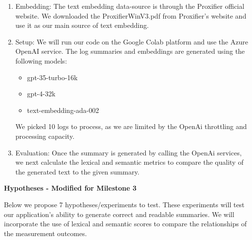 \documentclass[conference]{IEEEtran}
\begin{document}
\begin{enumerate}
      
    \item Embedding: The text embedding data-source is through the Proxifier official website. We downloaded the ProxifierWinV3.pdf from Proxifier's website and use it as our main source of text embedding.
    \item Setup: We will run our code on the Google Colab platform and use the Azure OpenAI service. The log summaries and embeddings are generated using the following models:
    \begin{itemize}
    \item gpt-35-turbo-16k
    \item gpt-4-32k
    \item text-embedding-ada-002
    \end{itemize}
    We picked 10 logs to process, as we are limited by the OpenAi throttling and processing capacity. 
    \item Evaluation: Once the summary is generated by calling the OpenAi services, we next calculate the lexical and semantic metrics to compare the quality of the generated text to the given summary.
\end{enumerate}

\textbf{Hypotheses - Modified for Milestone 3}

Below we propose 7 hypotheses/experiments to test. These experiments will test our application's ability to generate correct and readable summaries. We will incorporate the use of lexical and semantic scores to compare the relationships of the measurement outcomes.
\end{document}
